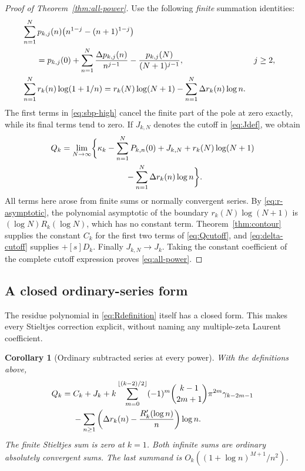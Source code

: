 \documentclass[11pt,a4paper]{article}
\numberwithin{equation}{section}
\newtheorem{corollary}[theorem]{Corollary}
\theoremstyle{definition}
\theoremstyle{remark}
\begin{document}
\begin{proof}[Proof of Theorem~\ref{thm:all-power}]
Use the following \emph{finite} summation identities:
\begin{align}
 &\sum_{n=1}^N p_{k,j}(n)
               \bigl(n^{1-j}-(n+1)^{1-j}\bigr)\notag\\
 &\hspace{6mm}=p_{k,j}(0)+
           \sum_{n=1}^N\frac{\Delta p_{k,j}(n)}{n^{j-1}}
                    -\frac{p_{k,j}(N)}{(N+1)^{j-1}},
                  &&j\ge2,\label{eq:sbp-high}\\
 &\sum_{n=1}^N r_k(n)\log(1+1/n)
     =r_k(N)\log(N+1)-\sum_{n=1}^N\Delta r_k(n)\log n.
 \label{eq:sbp-simple}
\end{align}
The first terms in \eqref{eq:sbp-high} cancel the finite part of
the pole at zero exactly, while its final terms tend to zero.
If $J_{k,N}$ denotes the cutoff in \eqref{eq:Jdef}, we obtain
\begin{align}
 Q_k=\lim_{N\to\infty}\biggl\{
 &\kappa_k-\sum_{n=1}^N P_{k,n}(0)+J_{k,N}
       +r_k(N)\log(N+1)\notag\\
 &\hspace{12mm}-\sum_{n=1}^N\Delta r_k(n)\log n\biggr\}.
 \label{eq:Qcutoff}
\end{align}
All terms here arose from finite sums or normally convergent series.
By \eqref{eq:r-asymptotic}, the polynomial asymptotic of the boundary
$r_k(N)\log(N+1)$ is $(\log N)R_k(\log N)$, which has no constant
term.  Theorem~\ref{thm:contour} supplies the constant $C_k$ for the
first two terms of \eqref{eq:Qcutoff}, and \eqref{eq:delta-cutoff}
supplies $+[s]D_k$.  Finally $J_{k,N}\to J_k$.  Taking the constant
coefficient of the complete cutoff expression proves
\eqref{eq:all-power}.
\end{proof}

\subsection{A closed ordinary-series form}

The residue polynomial in \eqref{eq:Rdefinition} itself has a closed
form.  This makes every Stieltjes correction explicit, without naming
any multiple-zeta Laurent coefficient.


\begin{corollary}[Ordinary subtracted series at every power]
\label{cor:ordinary-all}
With the definitions above,
\begin{align}
 Q_k={}&C_k+J_k+
 k\sum_{m=0}^{\lfloor(k-2)/2\rfloor}
       (-1)^m\binom{k-1}{2m+1}\pi^{2m}\gamma_{k-2m-1}
 \notag\\
 &-\sum_{n\ge1}
   \left(\Delta r_k(n)-\frac{R_k'(\log n)}n\right)\log n.
 \label{eq:ordinary-all}
\end{align}
The finite Stieltjes sum is zero at $k=1$.  Both infinite sums are
ordinary absolutely convergent sums.  The last summand is
$O_k((1+\log n)^{M+1}/n^2)$.
\end{corollary}
\end{document}
